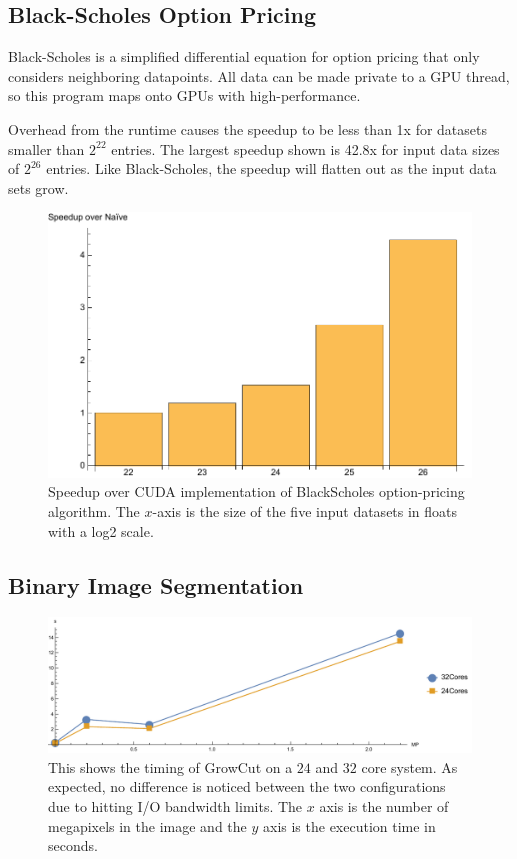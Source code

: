 \subsection{Black-Scholes Option Pricing}
Black-Scholes is a simplified differential equation for option pricing that only
considers neighboring datapoints. All data can be made private to a GPU thread,
so this program maps onto GPUs with high-performance.

Overhead from the runtime causes the speedup to be less than 1x for datasets
smaller than $2^{22}$ entries. The largest speedup shown is 42.8x for input
data sizes of $2^{26}$ entries. Like Black-Scholes, the speedup will flatten
out as the input data sets grow.

\begin{figure}
\centering
\includegraphics[scale=0.5]{data/blackscholes.pdf}
\caption{Speedup over CUDA implementation of BlackScholes option-pricing
algorithm. The $x$-axis is the size of the five input datasets in floats with
a log2 scale.}
\label{fig:blackscholes}
\centering
\end{figure}


\subsection{Binary Image Segmentation}

\begin{figure}
\centering
\includegraphics[scale=0.4]{fig/growcut.pdf}
\caption{This shows the timing of GrowCut on a $24$ and $32$ core system.
As expected, no difference is noticed between the two configurations due to hitting I/O
bandwidth limits. The $x$ axis is the number of megapixels in the image and the $y$ axis is the execution time in seconds.}
\label{fig:growcut}
\centering
\end{figure}

